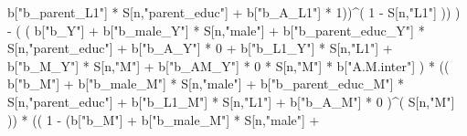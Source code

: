 \documentclass[
]{book}
\newenvironment{Shaded}{\begin{snugshade}}{\end{snugshade}}
\newcommand{\DecValTok}[1]{\textcolor[rgb]{0.00,0.00,0.81}{#1}}
\newcommand{\NormalTok}[1]{#1}
\newcommand{\SpecialCharTok}[1]{\textcolor[rgb]{0.00,0.00,0.00}{#1}}
\newcommand{\StringTok}[1]{\textcolor[rgb]{0.31,0.60,0.02}{#1}}
\begin{document}
\begin{Shaded}
\begin{Highlighting}[]
\NormalTok{                                   b[}\StringTok{"b\_parent\_L1"}\NormalTok{] }\SpecialCharTok{*}\NormalTok{ S[n,}\StringTok{"parent\_educ"}\NormalTok{] }\SpecialCharTok{+}
\NormalTok{                                   b[}\StringTok{"b\_A\_L1"}\NormalTok{] }\SpecialCharTok{*} \DecValTok{1}\NormalTok{))}\SpecialCharTok{\^{}}\NormalTok{( }\DecValTok{1} \SpecialCharTok{{-}}\NormalTok{ S[n,}\StringTok{"L1"}\NormalTok{] )) ) }\SpecialCharTok{{-}} 
\NormalTok{                    ( ( b[}\StringTok{"b\_Y"}\NormalTok{] }\SpecialCharTok{+} 
\NormalTok{                          b[}\StringTok{"b\_male\_Y"}\NormalTok{] }\SpecialCharTok{*}\NormalTok{ S[n,}\StringTok{"male"}\NormalTok{] }\SpecialCharTok{+} 
\NormalTok{                          b[}\StringTok{"b\_parent\_educ\_Y"}\NormalTok{] }\SpecialCharTok{*}\NormalTok{ S[n,}\StringTok{"parent\_educ"}\NormalTok{] }\SpecialCharTok{+} 
\NormalTok{                          b[}\StringTok{"b\_A\_Y"}\NormalTok{] }\SpecialCharTok{*} \DecValTok{0} \SpecialCharTok{+} 
\NormalTok{                          b[}\StringTok{"b\_L1\_Y"}\NormalTok{] }\SpecialCharTok{*}\NormalTok{ S[n,}\StringTok{"L1"}\NormalTok{] }\SpecialCharTok{+}
\NormalTok{                          b[}\StringTok{"b\_M\_Y"}\NormalTok{] }\SpecialCharTok{*}\NormalTok{ S[n,}\StringTok{"M"}\NormalTok{] }\SpecialCharTok{+}
\NormalTok{                          b[}\StringTok{"b\_AM\_Y"}\NormalTok{] }\SpecialCharTok{*} \DecValTok{0} \SpecialCharTok{*}\NormalTok{ S[n,}\StringTok{"M"}\NormalTok{] }\SpecialCharTok{*}\NormalTok{ b[}\StringTok{"A.M.inter"}\NormalTok{] ) }\SpecialCharTok{*}
\NormalTok{                        (( b[}\StringTok{"b\_M"}\NormalTok{] }\SpecialCharTok{+} 
\NormalTok{                             b[}\StringTok{"b\_male\_M"}\NormalTok{] }\SpecialCharTok{*}\NormalTok{ S[n,}\StringTok{"male"}\NormalTok{] }\SpecialCharTok{+} 
\NormalTok{                             b[}\StringTok{"b\_parent\_educ\_M"}\NormalTok{] }\SpecialCharTok{*}\NormalTok{ S[n,}\StringTok{"parent\_educ"}\NormalTok{] }\SpecialCharTok{+} 
\NormalTok{                             b[}\StringTok{"b\_L1\_M"}\NormalTok{] }\SpecialCharTok{*}\NormalTok{ S[n,}\StringTok{"L1"}\NormalTok{] }\SpecialCharTok{+}
\NormalTok{                             b[}\StringTok{"b\_A\_M"}\NormalTok{] }\SpecialCharTok{*} \DecValTok{0}\NormalTok{ )}\SpecialCharTok{\^{}}\NormalTok{( S[n,}\StringTok{"M"}\NormalTok{] )) }\SpecialCharTok{*}
\NormalTok{                        (( }\DecValTok{1} \SpecialCharTok{{-}}\NormalTok{ (b[}\StringTok{"b\_M"}\NormalTok{] }\SpecialCharTok{+} 
\NormalTok{                                  b[}\StringTok{"b\_male\_M"}\NormalTok{] }\SpecialCharTok{*}\NormalTok{ S[n,}\StringTok{"male"}\NormalTok{] }\SpecialCharTok{+} 

\end{Highlighting}
\end{Shaded}
\end{document}
